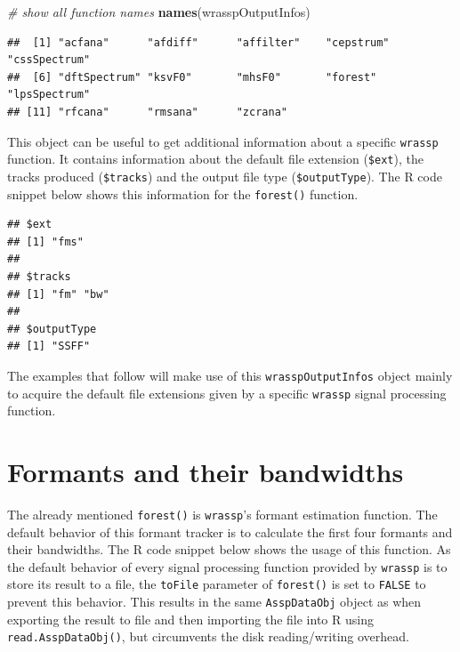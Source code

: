 \documentclass[]{book}
\newenvironment{Shaded}{\begin{snugshade}}{\end{snugshade}}
\newcommand{\CommentTok}[1]{\textcolor[rgb]{0.56,0.35,0.01}{\textit{#1}}}
\newcommand{\KeywordTok}[1]{\textcolor[rgb]{0.13,0.29,0.53}{\textbf{#1}}}
\newcommand{\NormalTok}[1]{#1}
\newcommand{\OperatorTok}[1]{\textcolor[rgb]{0.81,0.36,0.00}{\textbf{#1}}}
\begin{document}
\begin{Shaded}
\begin{Highlighting}[]
\CommentTok{# show all function names}
\KeywordTok{names}\NormalTok{(wrasspOutputInfos)}
\end{Highlighting}
\end{Shaded}

\begin{verbatim}
##  [1] "acfana"      "afdiff"      "affilter"    "cepstrum"    "cssSpectrum"
##  [6] "dftSpectrum" "ksvF0"       "mhsF0"       "forest"      "lpsSpectrum"
## [11] "rfcana"      "rmsana"      "zcrana"
\end{verbatim}

This object can be useful to get additional information about a specific \texttt{wrassp} function. It contains information about the default file extension (\texttt{\$ext}), the tracks produced (\texttt{\$tracks}) and the output file type (\texttt{\$outputType}). The R code snippet below shows this information for the \texttt{forest()} function.

\begin{Shaded}
\end{Shaded}

\begin{verbatim}
## $ext
## [1] "fms"
## 
## $tracks
## [1] "fm" "bw"
## 
## $outputType
## [1] "SSFF"
\end{verbatim}

The examples that follow will make use of this \texttt{wrasspOutputInfos} object mainly to acquire the default file extensions given by a specific \texttt{wrassp} signal processing function.

\hypertarget{subsec:wrassp-formants}{%
\section{Formants and their bandwidths}\label{subsec:wrassp-formants}}

The already mentioned \texttt{forest()} is \texttt{wrassp}'s formant estimation function. The default behavior of this formant tracker is to calculate the first four formants and their bandwidths. The R code snippet below shows the usage of this function. As the default behavior of every signal processing function provided by \texttt{wrassp} is to store its result to a file, the \texttt{toFile} parameter of \texttt{forest()} is set to \texttt{FALSE} to prevent this behavior. This results in the same \texttt{AsspDataObj} object as when exporting the result to file and then importing the file into R using \texttt{read.AsspDataObj()}, but circumvents the disk reading/writing overhead.
\end{document}
